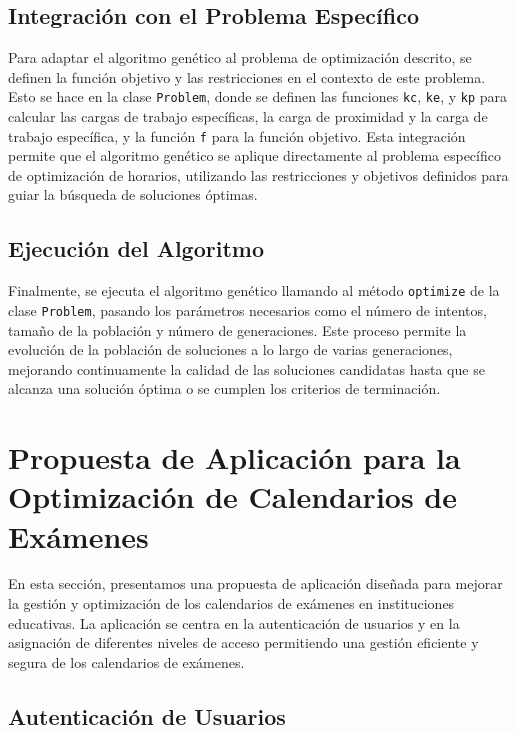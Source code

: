 \documentclass{article}
\begin{document}
\subsection{Integración con el Problema Específico}

Para adaptar el algoritmo genético al problema de optimización descrito, se definen la función objetivo y las restricciones en el contexto de este problema. Esto se hace en la clase \texttt{Problem}, donde se definen las funciones \texttt{kc}, \texttt{ke}, y \texttt{kp} para calcular las cargas de trabajo específicas, la carga de proximidad y la carga de trabajo específica, y la función \texttt{f} para la función objetivo. Esta integración permite que el algoritmo genético se aplique directamente al problema específico de optimización de horarios, utilizando las restricciones y objetivos definidos para guiar la búsqueda de soluciones óptimas.

\subsection{Ejecución del Algoritmo}

Finalmente, se ejecuta el algoritmo genético llamando al método \texttt{optimize} de la clase \texttt{Problem}, pasando los parámetros necesarios como el número de intentos, tamaño de la población y número de generaciones. Este proceso permite la evolución de la población de soluciones a lo largo de varias generaciones, mejorando continuamente la calidad de las soluciones candidatas hasta que se alcanza una solución óptima o se cumplen los criterios de terminación. 

\section{Propuesta de Aplicación para la Optimización de Calendarios de Exámenes}

En esta sección, presentamos una propuesta de aplicación diseñada para mejorar la gestión y optimización de los calendarios de exámenes en instituciones educativas. La aplicación se centra en la autenticación de usuarios y en la asignación de diferentes niveles de acceso permitiendo una gestión eficiente y segura de los calendarios de exámenes.

\subsection{Autenticación de Usuarios}
\end{document}
